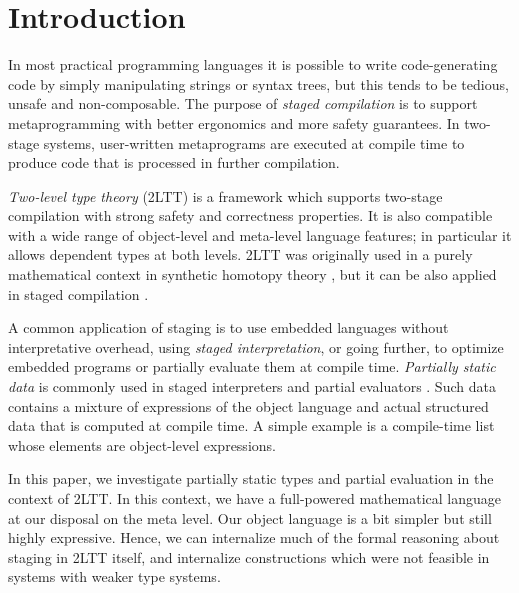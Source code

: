 \documentclass[acmsmall,review,screen]{acmart}
\theoremstyle{remark}
\begin{document}
\maketitle

\section{Introduction}\label{sec:introduction}

In most practical programming languages it is possible to write code-generating
code by simply manipulating strings or syntax trees, but this tends to be
tedious, unsafe and non-composable. The purpose of \emph{staged compilation} is
to support metaprogramming with better ergonomics and more safety guarantees. In
two-stage systems, user-written metaprograms are executed at compile time to
produce code that is processed in further compilation.

\emph{Two-level type theory} (2LTT) is a framework which supports two-stage
compilation with strong safety and correctness properties. It is also compatible
with a wide range of object-level and meta-level language features; in
particular it allows dependent types at both levels. 2LTT was originally used in
a purely mathematical context in synthetic homotopy theory \cite{twolevel}, but
it can be also applied in staged compilation \cite{2ltt-staged}.

A common application of staging is to use embedded languages without
interpretative overhead, using \emph{staged interpretation}, or going further,
to optimize embedded programs or partially evaluate them at compile
time. \emph{Partially static data} is commonly used in staged interpreters and
partial evaluators \cite{TODO}. Such data contains a mixture of expressions of
the object language and actual structured data that is computed at compile time.
A simple example is a compile-time list whose elements are object-level expressions.

In this paper, we investigate partially static types and partial evaluation in
the context of 2LTT. In this context, we have a full-powered mathematical
language at our disposal on the meta level. Our object language is a bit simpler
but still highly expressive. Hence, we can internalize much of the formal
reasoning about staging in 2LTT itself, and internalize constructions which were
not feasible in systems with weaker type systems.
\end{document}
